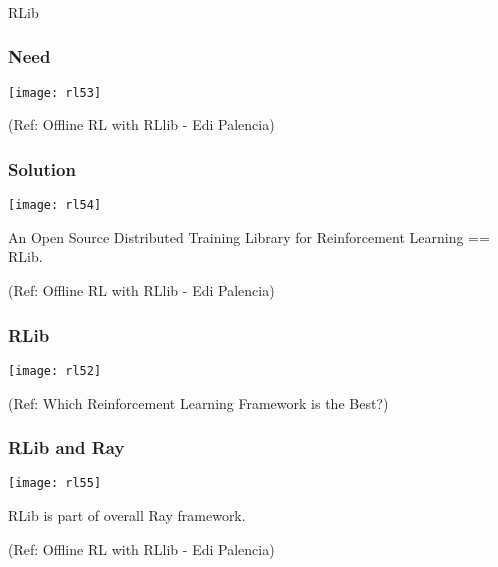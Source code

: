 \begin{frame}[fragile]\frametitle{}
\begin{center}
{\Large RLib}
\end{center}
\end{frame}


\begin{frame}[fragile]\frametitle{Need}


\begin{center}
\texttt{[image: rl53]}
\end{center}

{\tiny (Ref: Offline RL with RLlib - Edi Palencia)}

\end{frame}

\begin{frame}[fragile]\frametitle{Solution}


\begin{center}
\texttt{[image: rl54]}
\end{center}

An Open Source Distributed Training Library for Reinforcement Learning == RLib.

{\tiny (Ref: Offline RL with RLlib - Edi Palencia)}

\end{frame}

\begin{frame}[fragile]\frametitle{RLib}

\begin{center}
\texttt{[image: rl52]}
\end{center}

{\tiny (Ref: Which Reinforcement Learning Framework is the Best?)}

\end{frame}

\begin{frame}[fragile]\frametitle{RLib and Ray}


\begin{center}
\texttt{[image: rl55]}
\end{center}

RLib is part of overall Ray framework.

{\tiny (Ref: Offline RL with RLlib - Edi Palencia)}

\end{frame}

